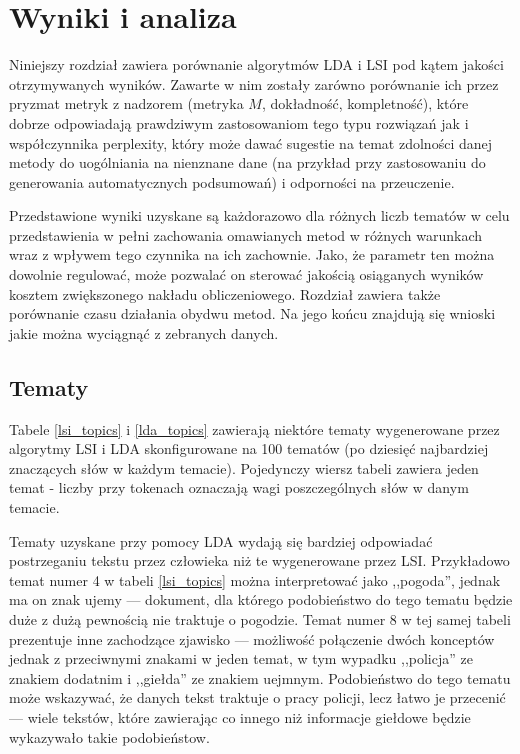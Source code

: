\documentclass[11pt,a4paper]{article}
\begin{document}
\section{Wyniki i analiza}
\label{sec:results}

Niniejszy rozdział zawiera porównanie algorytmów LDA i LSI pod kątem jakości
otrzymywanych wyników. Zawarte w nim zostały zarówno porównanie ich przez
pryzmat metryk z nadzorem (metryka $M$, dokładność, kompletność), które dobrze
odpowiadają prawdziwym zastosowaniom tego typu rozwiązań jak i współczynnika
perplexity, który może dawać sugestie na temat zdolności danej metody do
uogólniania na nienznane dane (na przykład przy zastosowaniu do generowania
automatycznych podsumowań) i odporności na przeuczenie.

Przedstawione wyniki uzyskane są każdorazowo dla różnych liczb tematów w celu
przedstawienia w pełni zachowania omawianych metod w różnych warunkach wraz z
wpływem tego czynnika na ich zachownie. Jako, że parametr ten można dowolnie
regulować, może pozwalać on sterować jakością osiąganych wyników kosztem
zwiększonego nakładu obliczeniowego. Rozdział zawiera także porównanie czasu
działania obydwu metod. Na jego końcu znajdują się wnioski jakie można
wyciągnąć z zebranych danych.

\subsection{Tematy}
Tabele \ref{lsi_topics} i \ref{lda_topics} zawierają niektóre tematy
wygenerowane przez algorytmy LSI i LDA skonfigurowane na 100 tematów (po
dziesięć najbardziej znaczących słów w każdym temacie). Pojedynczy wiersz
tabeli zawiera jeden temat - liczby przy tokenach oznaczają wagi poszczególnych
słów w danym temacie.

Tematy uzyskane przy pomocy LDA wydają się bardziej odpowiadać postrzeganiu
tekstu przez człowieka niż te wygenerowane przez LSI.  Przykładowo temat numer
4 w tabeli \ref{lsi_topics} można interpretować jako ,,pogoda'', jednak ma on
znak ujemy --- dokument, dla którego podobieństwo do tego tematu będzie duże z
dużą pewnością nie traktuje o pogodzie. Temat numer 8 w tej samej tabeli
prezentuje inne zachodzące zjawisko --- możliwość połączenie dwóch konceptów
jednak z przeciwnymi znakami w jeden temat, w tym wypadku ,,policja'' ze
znakiem dodatnim i ,,giełda'' ze znakiem uejmnym. Podobieństwo do tego tematu
może wskazywać, że danych tekst traktuje o pracy policji, lecz łatwo je
przecenić --- wiele tekstów, które zawierając co innego niż informacje giełdowe
będzie wykazywało takie podobieństow.
\end{document}
